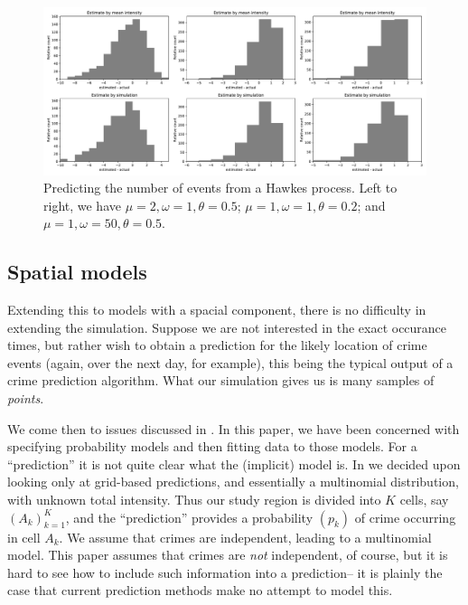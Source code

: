 \documentclass[twoside,a4paper]{article}
\theoremstyle{plain}
\theoremstyle{definition}
\begin{document}
\begin{figure}
  \includegraphics[width=\textwidth]{../notebooks/hawkes_predictions.pdf}
  \caption{Predicting the number of events from a Hawkes process.  Left to right, we have
$\mu=2,\omega=1,\theta=0.5$; $\mu=1,\omega=1,\theta=0.2$; and $\mu=1,\omega=50,\theta=0.5$.}
  \label{fig:hawkes_pred}
\end{figure}



\subsection{Spatial models}

Extending this to models with a spacial component, there is no difficulty in extending the
simulation.  Suppose we are not interested in the exact occurance times, but rather wish to
obtain a prediction for the likely location of crime events (again, over the next day, for example),
this being the typical output of a crime prediction algorithm.  What our simulation gives us
is many samples of \emph{points}.

We come then to issues discussed in \cite{daws2}.  In this paper, we have been concerned
with specifying probability models and then fitting data to those models.  For a ``prediction''
it is not quite clear what the (implicit) model is.  In \cite{daws2} we decided upon
looking only at grid-based predictions, and essentially a multinomial distribution, with
unknown total intensity.  Thus our study region is divided into $K$ cells, say $(A_k)_{k=1}^K$,
and the ``prediction'' provides a probability $(p_k)$ of crime occurring in cell $A_k$.
We assume that crimes are independent, leading to a multinomial model.  This paper assumes that
crimes are \emph{not} independent, of course, but it is hard to see how to include such
information into a prediction-- it is plainly the case that current prediction methods make
no attempt to model this.
\end{document}
